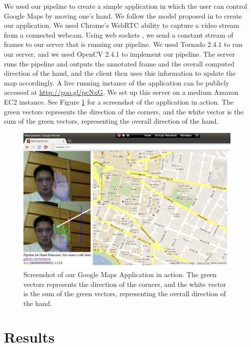 \documentclass[12pt]{article}
\begin{document}
We used our pipeline to create a simple application in which the user can control Google Maps by moving one's hand. We follow the model proposed in \cite{webtutorial} to create our application. We used Chrome's WebRTC \cite{webrtc} ability to capture a video stream from a connected webcam. Using web sockets \cite{websockets}, we send a constant stream of frames to our server that is running our pipeline. We used Tornado 2.4.1 \cite{tornado} to run our server, and we used OpenCV 2.4.1\cite{opencv} to implement our pipeline. The server runs the pipeline and outputs the annotated frame and the overall computed direction of the hand, and the client then uses this information to update the map accordingly. A live running instance of the application can be publicly accessed at \url{http://goo.gl/pcNxG}. We set up this server on a medium Amazon EC2 instance. See Figure \ref{map} for a screenshot of the application in action. The green vectors represents the direction of the corners, and the white vector is the sum of the green vectors, representing the overall direction of the hand.

\noindent\begin{figure}[H]
\centering
\includegraphics[scale=0.45]{map.png}
\caption{Screenshot of our Google Maps Application in action. The green vectors represents the direction of the corners, and the white vector is the sum of the green vectors, representing the overall direction of the hand.}
\label{map}
\end{figure}

\section{Results}
\end{document}
